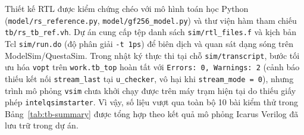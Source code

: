 \documentclass[11pt,a4paper]{report}
\begin{document}
Thiết kế RTL được kiểm chứng chéo với mô hình toán học Python (\texttt{model/rs\_reference.py}, \texttt{model/gf256\_model.py}) và thư viện hàm tham chiếu \texttt{tb/rs\_tb\_ref.vh}. Dự án cung cấp tệp danh sách \texttt{sim/rtl\_files.f} và kịch bản Tcl \texttt{sim/run.do} (độ phân giải \texttt{-t 1ps}) để biên dịch và quan sát dạng sóng trên ModelSim/QuestaSim. Trong nhật ký thực thi tại chỗ \texttt{sim/transcript}, bước tối ưu hóa \texttt{vopt} trên \texttt{work.tb\_top} hoàn tất với \texttt{Errors: 0, Warnings: 2} (cảnh báo thiếu kết nối \texttt{stream\_last} tại \texttt{u\_checker}, vô hại khi \texttt{stream\_mode = 0}), nhưng trình mô phỏng \texttt{vsim} chưa khởi chạy được trên máy trạm hiện tại do thiếu giấy phép \texttt{intelqsimstarter}. Vì vậy, số liệu vượt qua toàn bộ 10 bài kiểm thử trong Bảng~\ref{tab:tb-summary} được tổng hợp theo kết quả mô phỏng Icarus Verilog đã lưu trữ trong dự án.
\end{document}
